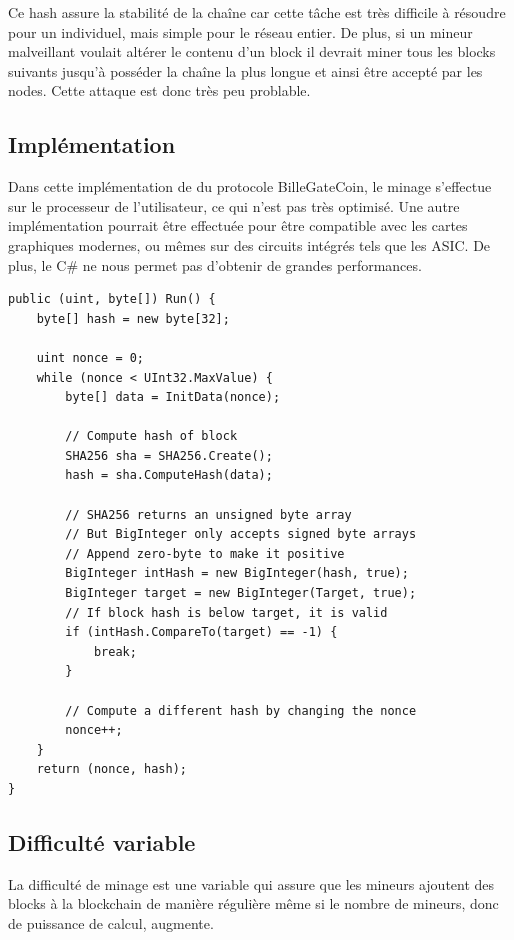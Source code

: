 \documentclass{article}
\begin{document}
Ce hash assure la stabilité de la chaîne car cette tâche est très difficile à résoudre pour un individuel, mais simple pour le réseau entier. De plus, si un mineur malveillant voulait altérer le contenu d'un block il devrait miner tous les blocks suivants jusqu'à posséder la chaîne la plus longue et ainsi être accepté par les nodes. Cette attaque est donc très peu problable.

\subsection{Implémentation}

Dans cette implémentation de  du protocole BilleGateCoin, le minage s'effectue sur le processeur de l'utilisateur, ce qui n'est pas très optimisé. Une autre implémentation pourrait être effectuée pour être compatible avec les cartes graphiques modernes, ou mêmes sur des circuits intégrés tels que les ASIC. De plus, le C\# ne nous permet pas d'obtenir de grandes performances. \\
\filbreak
\begin{verbatim}
public (uint, byte[]) Run() {
    byte[] hash = new byte[32];

    uint nonce = 0;
    while (nonce < UInt32.MaxValue) {
        byte[] data = InitData(nonce);
        
        // Compute hash of block
        SHA256 sha = SHA256.Create();
        hash = sha.ComputeHash(data);
        
        // SHA256 returns an unsigned byte array
        // But BigInteger only accepts signed byte arrays
        // Append zero-byte to make it positive
        BigInteger intHash = new BigInteger(hash, true);
        BigInteger target = new BigInteger(Target, true);
        // If block hash is below target, it is valid
        if (intHash.CompareTo(target) == -1) {
            break;
        }

        // Compute a different hash by changing the nonce
        nonce++;
    }
    return (nonce, hash);
}
\end{verbatim}

\subsection{Difficulté variable}
La difficulté de minage est une variable qui assure que les mineurs ajoutent des blocks à la blockchain de manière régulière même si le nombre de mineurs, donc de puissance de calcul, augmente.
 
\end{document}
